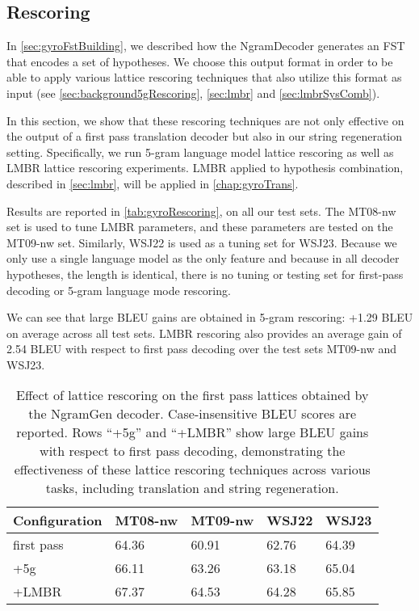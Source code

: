 \subsection{Rescoring}
\label{gyro:rescoring}

In \autoref{sec:gyroFstBuilding}, we described how the NgramDecoder
generates an FST that encodes a set of hypotheses.
We choose this output format in order to be able to apply
various lattice rescoring techniques that also utilize this format
as input (see \autoref{sec:background5gRescoring}, \autoref{sec:lmbr}
and \autoref{sec:lmbrSysComb}).

In this section, we show that these rescoring techniques
are not only effective on the output of a first pass translation decoder
but also in our string regeneration setting.
Specifically, we run 5-gram language model lattice rescoring as well
as LMBR lattice rescoring experiments. LMBR applied to hypothesis combination,
described in \autoref{sec:lmbr}, will be applied in \autoref{chap:gyroTrans}.

Results are reported in \autoref{tab:gyroRescoring}, on all our test sets.
The MT08-nw set is used to tune LMBR parameters, and these parameters are
tested on the MT09-nw set. Similarly, WSJ22 is used as a tuning set for WSJ23.
Because we only use a single language model as the only feature and because in all decoder
hypotheses, the length is identical, there is no tuning or testing set
for first-pass decoding or 5-gram language mode rescoring.

We can see that large BLEU gains are obtained in 5-gram rescoring: +1.29 BLEU
on average across all test sets. LMBR rescoring also provides
an average gain of 2.54 BLEU with respect to first pass decoding over the
test sets MT09-nw and WSJ23.
%
\begin{table}
  \begin{center}
  \begin{tabular}{l|l|l|l|l}
    Configuration & MT08-nw & MT09-nw & WSJ22 & WSJ23 \\
    \hline
    first pass & 64.36 & 60.91 & 62.76 & 64.39 \\
    +5g       & 66.11 & 63.26 & 63.18 & 65.04 \\
    +LMBR     & 67.37 & 64.53 & 64.28 & 65.85 \\
  \end{tabular}
  \caption{Effect of lattice rescoring on the first pass lattices obtained
    by the NgramGen decoder. Case-insensitive BLEU scores are reported.
    Rows ``+5g'' and ``+LMBR'' show large BLEU gains with respect to
    first pass decoding, demonstrating the effectiveness of these lattice
    rescoring techniques across various tasks, including translation and
    string regeneration.}
  \label{tab:gyroRescoring}
  \end{center}
\end{table}


